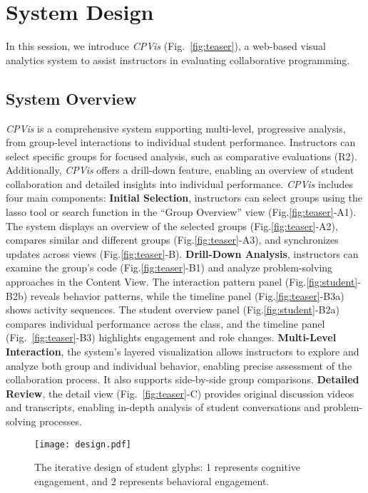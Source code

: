 


\section{System Design} 
\label{sec:vis}

In this session, we introduce \textit{CPVis} (Fig.~\ref{fig:teaser}), a web-based visual analytics system to assist instructors in evaluating collaborative programming.
\subsection{System Overview}
\textit{CPVis} is a comprehensive system supporting multi-level, progressive analysis, from group-level interactions to individual student performance. Instructors can select specific groups for focused analysis, such as comparative evaluations (R2). Additionally, \textit{CPVis} offers a drill-down feature, enabling an overview of student collaboration and detailed insights into individual performance.
\textit{CPVis} includes four main components:
\textbf{Initial Selection}, instructors can select groups using the lasso tool or search function in the ``Group Overview'' view (Fig.\ref{fig:teaser}-A1). The system displays an overview of the selected groups (Fig.\ref{fig:teaser}-A2), compares similar and different groups (Fig.\ref{fig:teaser}-A3), and synchronizes updates across views (Fig.\ref{fig:teaser}-B).
\textbf{Drill-Down Analysis}, instructors can examine the group's code (Fig.\ref{fig:teaser}-B1) and analyze problem-solving approaches in the Content View. The interaction pattern panel (Fig.\ref{fig:student}-B2b) reveals behavior patterns, while the timeline panel (Fig.\ref{fig:teaser}-B3a) shows activity sequences. The student overview panel (Fig.\ref{fig:student}-B2a) compares individual performance across the class, and the timeline panel (Fig.~\ref{fig:teaser}-B3) highlights engagement and role changes.
\textbf{Multi-Level Interaction}, the system's layered visualization allows instructors to explore and analyze both group and individual behavior, enabling precise assessment of the collaboration process. It also supports side-by-side group comparisons.
\textbf{Detailed Review}, the detail view (Fig.~\ref{fig:teaser}-C) provides original discussion videos and transcripts, enabling in-depth analysis of student conversations and problem-solving processes.
\begin{figure}
	\centering
	\texttt{[image: design.pdf]}
	\caption{The iterative design of student glyphs: 1 represents cognitive engagement, and 2 represents behavioral engagement.}
	\label{fig:designl}
\end{figure}

